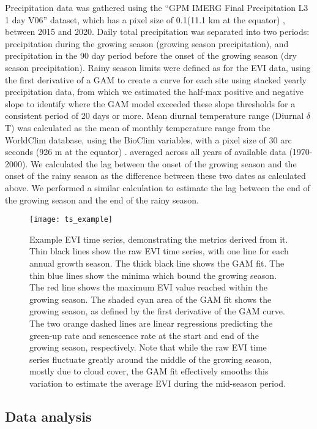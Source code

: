 \documentclass[11pt,a4paper]{article}
\begin{document}
Precipitation data was gathered using the ``GPM IMERG Final Precipitation L3 1 day V06'' dataset, which has a pixel size of 0.1\textdegree (11.1 km at the equator) \citep{GPM}, between 2015 and 2020. Daily total precipitation was separated into two periods: precipitation during the growing season (growing season precipitation), and precipitation in the 90 day period before the onset of the growing season (dry season precipitation). Rainy season limits were defined as for the EVI data, using the first derivative of a GAM to create a curve for each site using stacked yearly precipitation data, from which we estimated the half-max positive and negative slope to identify where the GAM model exceeded these slope thresholds for a consistent period of 20 days or more. Mean diurnal temperature range (Diurnal $\delta$T) was calculated as the mean of monthly temperature range from the WorldClim database, using the BioClim variables, with a pixel size of 30 arc seconds (926 m at the equator) \citep{Fick2017}. averaged across all years of available data (1970-2000). We calculated the lag between the onset of the growing season and the onset of the rainy season as the difference between these two dates as calculated above. We performed a similar calculation to estimate the lag between the end of the growing season and the end of the rainy season. 


\begin{figure}[H]
\centering
	\texttt{[image: ts\_example]}
	\caption{Example EVI time series, demonstrating the metrics derived from it. Thin black lines show the raw EVI time series, with one line for each annual growth season. The thick black line shows the GAM fit. The thin blue lines show the minima which bound the growing season. The red line shows the maximum EVI value reached within the growing season. The shaded cyan area of the GAM fit shows the growing season, as defined by the first derivative of the GAM curve. The two orange dashed lines are linear regressions predicting the green-up rate and senescence rate at the start and end of the growing season, respectively. Note that while the raw EVI time series fluctuate greatly around the middle of the growing season, mostly due to cloud cover, the GAM fit effectively smooths this variation to estimate the average EVI during the mid-season period.}
	\label{ts_example}
\end{figure}

\subsection{Data analysis}
\end{document}
